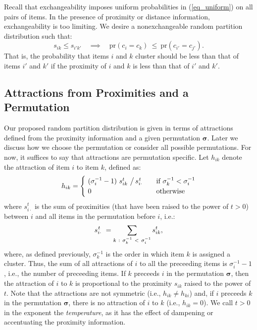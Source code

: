 \documentclass[lineno]{biometrika-dbd}
\begin{document}
Recall that exchangeability imposes uniform probabilities in (\ref{eq_uniform})
on all pairs of items.  In the presence of proximity or distance information,
exchangeability is too limiting.  We desire a nonexchangeable random partition
distribution such that:
\begin{equation}
\label{eq_nonuniform}
s_{ik} \le s_{i'k'} \quad \implies \quad \text{pr}(c_i = c_k) \ \le \ \text{pr}(c_{i'} = c_{j'}).
\end{equation}
That is, the probability that items $i$ and $k$ cluster should be less
than that of items $i'$ and $k'$ if the proximity of $i$ and $k$ is less than
that of $i'$ and $k'$.

\subsection{Attractions from Proximities and a Permutation}
\label{sec_proposal_proximities}

Our proposed random partition distribution is given in terms of attractions
defined from the proximity information and a given permutation $\bm{\sigma}$.
Later we discuss how we choose the permutation or consider all possible
permutations.  For now, it suffices to say that attractions are permutation
specific.  Let $h_{ik}$ denote the attraction of item $i$ to item $k$, defined
as:
\begin{equation}
\label{eq_attraction}
h_{ik} = 
\begin{cases}
\ ( \sigma^{-1}_i - 1 ) \ s_{ik}^t \ \big/ \, s_{i\cdot}^{\hspace{0.15ex}t} \quad & \text{if} \ \sigma^{-1}_k < \sigma^{-1}_i \\
\ 0 & \text{otherwise}
\end{cases}
\end{equation}
where $s_{i\cdot}^t$ is the sum of proximities (that have been raised to the power of $t>0$) between $i$
and all items in the permutation before $i$, i.e.:
\begin{equation}
s_{i\cdot}^{\hspace{0.15ex}t} \ = \sum_{k \ : \ \sigma^{-1}_k \ < \ \sigma^{-1}_i} s_{ik}^t,
\end{equation}
where, as defined previously, $\sigma^{-1}_k$ is the order in which item $k$ is
assigned a cluster.  Thus, the sum of all attractions of $i$ to all the
preceeding items is $\sigma^{-1}_i - 1$, i.e., the number of preceeding items.
If $k$ preceeds $i$ in the permutation $\bm{\sigma}$, then the attraction of
$i$ to $k$ is proportional to the proximity $s_{ik}$ raised to the power of
$t$.  Note that the attractions are not symmetric (i.e., $h_{ik} \not= h_{ki}$)
and, if $i$ preceeds $k$ in the permutation $\bm{\sigma}$, there is no
attraction of $i$ to $k$ (i.e., $h_{ik} = 0$).  We call $t>0$ in the exponent
the \emph{temperature}, as it has the effect of dampening or accentuating the
proximity information.
\end{document}
